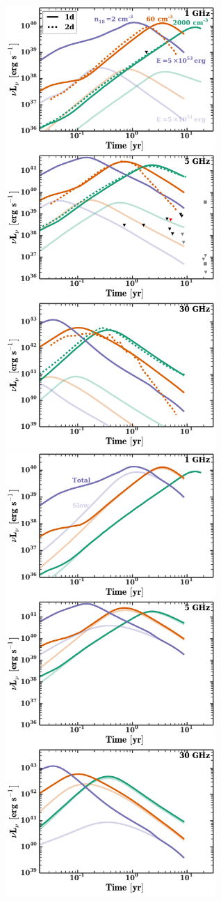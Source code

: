 \documentclass[usenatbib,fleqn]{mnras}
\begin{document}
\begin{figure} 
  \includegraphics[width=8cm]{lightcurves.pdf}
  \includegraphics[width=8cm]{lightcurves_comp.pdf}

\end{figure}
\end{document}
